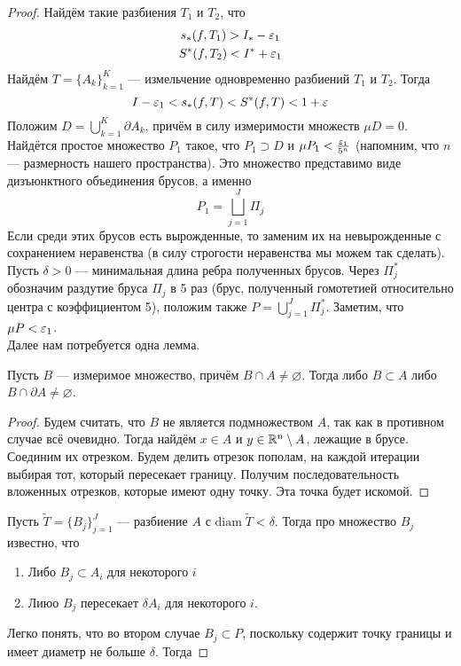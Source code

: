 \begin{proof}
    Найдём такие разбиения $T_1$ и $T_2$, что 
    \begin{gather}
        s_*(f, T_1) > I_* - \varepsilon_1\\
        S^*(f, T_2) < I^* + \varepsilon_1
    \end{gather}
    Найдём $T = \{A_k\}_{k =1}^{K}$ --- измельчение одновременно разбиений $T_1$ и $T_2$. Тогда
    $$
        I - \varepsilon_1 < s_*(f, T) < S^*(f, T) < 1 + \varepsilon
    $$
    Положим $D = \bigcup\limits_{k=1}^K \partial A_k$, причём в силу измеримости множеств $\mu D =0$. Найдётся простое множество $P_1$ такое, что $P_1 \supset D$ и $\mu P_1 < \frac{\varepsilon_1}{5^n}$ (напомним, что $n$ --- размерность нашего пространства). Это множество представимо виде дизъюнктного объединения брусов, а именно
    \[
        P_1 = \bigsqcup\limits_{j=1}^J \Pi_j 
    \]
    Если среди этих брусов есть вырожденные, то заменим их на невырожденные с сохранением неравенства (в силу строгости неравенства мы можем так сделать). Пусть $\delta > 0$ --- минимальная длина ребра полученных брусов. Через $\Pi_j^*$ обозначим раздутие бруса $\Pi_j$ в 5 раз (брус, полученный гомотетией относительно центра с коэффициентом 5), положим также $P = \bigcup\limits_{j=1}^J \Pi_j^*$. Заметим, что $\mu P < \varepsilon_1$.\\
    Далее нам потребуется одна лемма.
    \begin{Lemma}
        Пусть $B$ --- измеримое множество, причём $B \cap A \neq \varnothing$. Тогда либо $B \subset A$ либо $B \cap \partial A \neq \varnothing$.
    \end{Lemma}
    \begin{proof}
    Будем считать, что $B$ не является подмножеством $A$, так как в противном случае всё очевидно. Тогда найдём $x \in A$ и $y \in \mathbb{R}^n\setminus A$, лежащие в брусе. Соединим их отрезком. Будем делить отрезок пополам, на каждой итерации выбирая тот, который пересекает границу. Получим последовательность вложенных отрезков, которые имеют одну точку. Эта точка будет искомой.
    \end{proof}
    Пусть $\widetilde{T} = \{B_j\}_{j=1}^{J}$ --- разбиение $A$ с $\mathrm{diam}\; \widetilde T < \delta$. Тогда про множество $B_j$ известно, что
    \begin{enumerate}
        \item Либо $B_j \subset A_i$ для некоторого $i$
        \item Лиюо $B_j$ пересекает $\delta A_i$ для некоторого $i$.
    \end{enumerate}
    Легко понять, что во втором случае $B_j \subset P$, поскольку содержит точку границы и имеет диаметр не больше $\delta$. Тогда

\end{proof}
